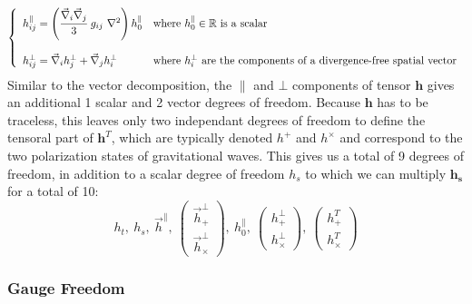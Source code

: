 \begin{equation}
\left\{
\begin{array}{ll}
h^{\parallel}_{ij} = \left(\cfrac{\vec{\nabla}_i \vec{\nabla}_j }{3} ~g_{ij}~ \nabla^2 \right) h^{\parallel}_0 & \text{where}~h^{\parallel}_0 \in \mathbb{R} ~\text{is a scalar}\\
\\
h^{\bot}_{ij} = \vec{\nabla}_i h^{\bot}_j + \vec{\nabla}_j h^{\bot}_i & \text{where}~ h^{\bot}_i ~\text{are the components of a divergence-free spatial vector}
\end{array}
\right.
\end{equation} Similar to the vector decomposition, the $\parallel$ and $\bot$ components of tensor $\pmb{h}$ gives an additional 1 scalar and 2 vector degrees of freedom. Because $\pmb{h}$ has to be traceless, this leaves only two independant degrees of freedom to define the tensoral part of $\pmb{h}^T$, which are typically denoted $h^{+}$ and $h^{\times}$ and correspond to the two polarization states of gravitational waves. This gives us a total of 9 degrees of freedom, in addition to a scalar degree of freedom $h_s$ to which we can multiply $\pmb{h_s}$ for a total of 10:
\begin{equation*}
h_t, ~h_s, ~\vec{h}^{\parallel},
~\left(
\begin{array}{c}
\vec{h}^{\bot}_{+}\\
\vec{h}^{\bot}_{\times}
\end{array}
\right), ~h^{\parallel}_0, 
~\left(
\begin{array}{c}
h^{\bot}_{+}\\
h^{\bot}_{\times}
\end{array}
\right), 
~\left(
\begin{array}{c}
h^{T}_{+}\\
h^{T}_{\times}
\end{array}
\right)
\end{equation*}

\subsubsection{Gauge Freedom}
\label{sec:gauge}


